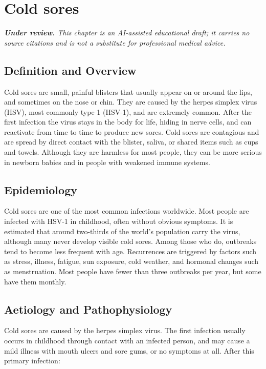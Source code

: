 \chapter{Cold sores}

\medskip
\noindent\textit{\textbf{Under review.} This chapter is an AI-assisted educational draft; it carries no source citations and is not a substitute for professional medical advice.}

\section*{Definition and Overview}
Cold sores are small, painful blisters that usually appear on or around the lips, and sometimes on the nose or chin. They are caused by the herpes simplex virus (HSV), most commonly type 1 (HSV-1), and are extremely common. After the first infection the virus stays in the body for life, hiding in nerve cells, and can reactivate from time to time to produce new sores. Cold sores are contagious and are spread by direct contact with the blister, saliva, or shared items such as cups and towels. Although they are harmless for most people, they can be more serious in newborn babies and in people with weakened immune systems.

\section*{Epidemiology}
Cold sores are one of the most common infections worldwide. Most people are infected with HSV-1 in childhood, often without obvious symptoms. It is estimated that around two-thirds of the world's population carry the virus, although many never develop visible cold sores. Among those who do, outbreaks tend to become less frequent with age. Recurrences are triggered by factors such as stress, illness, fatigue, sun exposure, cold weather, and hormonal changes such as menstruation. Most people have fewer than three outbreaks per year, but some have them monthly.

\section*{Aetiology and Pathophysiology}
Cold sores are caused by the herpes simplex virus. The first infection usually occurs in childhood through contact with an infected person, and may cause a mild illness with mouth ulcers and sore gums, or no symptoms at all. After this primary infection:

